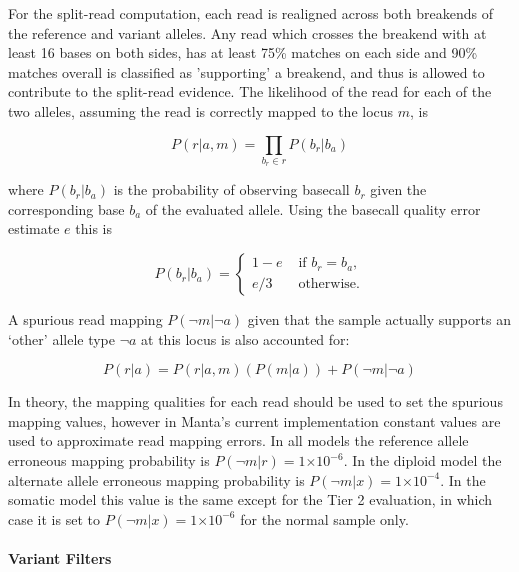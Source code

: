 \documentclass{article}
\newcommand{\e}[1]{\ensuremath{\times 10^{#1}}}
\begin{document}
For the split-read computation, each read is realigned across both breakends of the reference and variant alleles. Any read which crosses the breakend with at least 16 bases on both sides, has at least 75\% matches on each side and 90\% matches overall is classified as 'supporting' a breakend, and thus is allowed to contribute to the split-read evidence. The likelihood of the read for each of the two alleles, assuming the read is correctly mapped to the locus $m$, is

\begin{equation*}
P (r \vert a,m) = \prod_{b_r \in r} P(b_r \vert b_a)
\end{equation*}

\noindent
where $P(b_r \vert b_a)$ is the probability of observing basecall $b_r$ given the corresponding base $b_a$ of the evaluated allele. Using the basecall quality error estimate $e$ this is

\begin{equation*}
P(b_r \vert b_a) =
\left\{
\begin{array}{rl}
1-e & \mbox{ if $b_r=b_a$,} \\
e/3 & \mbox{ otherwise.}
\end{array}
\right.
\end{equation*}

A spurious read mapping $P(\neg m \vert \neg a)$ given that the sample actually supports an `other' allele type $\neg a$ at this locus is also accounted for:

\begin{equation*}
P ( r \vert a) = P ( r \vert a,m ) (P(m \vert a))  + P (\neg m \vert \neg a)
\end{equation*}

In theory, the mapping qualities for each read should be used to set the spurious mapping values, however in Manta's current implementation constant values are used to approximate read mapping errors.  In all models the reference allele erroneous mapping probability is $P(\neg m \vert r) =  1\e{-6}$. In the diploid model the alternate allele erroneous mapping probability is $P(\neg m \vert x) =  1\e{-4}$. In the somatic model this value is the same except for the Tier 2 evaluation, in which case it is set to $P(\neg m \vert x) =  1\e{-6}$ for the normal sample only.

\paragraph{Variant Filters}
\end{document}
